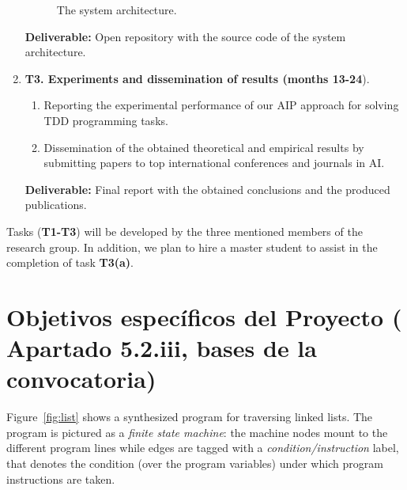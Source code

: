\documentclass[10pt,a4paper]{paper}
\begin{document}
\begin{enumerate}
\begin{figure}[hbt!]
\begin{center}
\end{center}  
\caption{\small The system architecture.}
\label{fig:architecture}
\end{figure}

{\small {\bf Deliverable:} Open repository with the source code of the system architecture.}
    
\item {\bf T3. Experiments and dissemination of results (months 13-24}).
   \begin{small}
      \begin{enumerate}
      \item Reporting the experimental performance of our AIP approach for solving TDD programming tasks.
      \item Dissemination of the obtained theoretical and empirical results by submitting papers to top international conferences and journals in AI.        
      \end{enumerate}
\end{small}        
{\small {\bf Deliverable:} Final report with the obtained conclusions and the produced publications.}
\end{enumerate}

Tasks ({\bf T1-T3}) will be developed by the three mentioned members of the research group. In addition, we plan to hire a master student to assist in the completion of task {\bf T3(a)}.   


\newpage
\section{Objetivos específicos del Proyecto ( Apartado 5.2.iii, bases de la convocatoria)}
\label{subsec:objectivos}

Figure~\ref{fig:list} shows a synthesized program for traversing linked lists. The program is pictured as a {\em finite state machine}: the machine nodes mount to the different program lines while edges are tagged with a {\em condition/instruction} label, that denotes the condition (over the program variables) under which program instructions are taken.  
\end{document}
